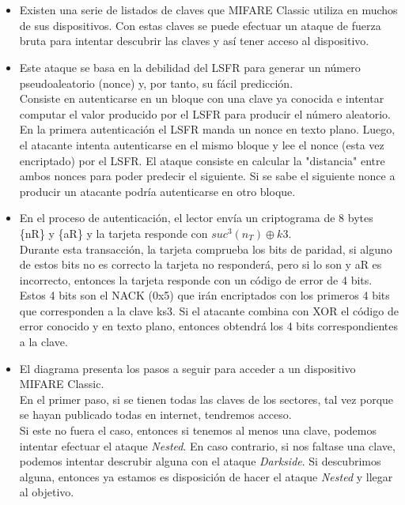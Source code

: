 \documentclass[10pt,a4paper]{article}
\begin{document}
\section{}
\begin{itemize}
\item Existen una serie de listados de claves que MIFARE Classic utiliza en muchos de sus dispositivos. Con estas claves se puede efectuar un ataque de fuerza bruta para intentar descubrir las claves y así tener acceso al dispositivo.

\item Este ataque se basa en la debilidad del LSFR para generar un número pseudoaleatorio (nonce) y, por tanto, su fácil predicción. \\
Consiste en autenticarse en un bloque con una clave ya conocida e intentar computar el valor producido por el LSFR para producir el número aleatorio. En la primera autenticación el LSFR manda un nonce en texto plano. Luego, el atacante intenta autenticarse en el mismo bloque y lee el nonce (esta vez encriptado) por el LSFR. El ataque consiste en calcular la "distancia" entre ambos nonces para poder predecir el siguiente. Si se sabe el siguiente nonce a producir un atacante podría autenticarse en otro bloque.

\item En el proceso de autenticación, el lector envía un criptograma de 8 bytes \{nR\} y \{aR\} y la tarjeta responde con $suc^{3}(n_{T}) \oplus k3$. \\
Durante esta transacción, la tarjeta comprueba los bits de paridad, si alguno de estos bits no es correcto la tarjeta no responderá, pero si lo son y {aR} es incorrecto, entonces la tarjeta responde con un código de error de 4 bits. Estos 4 bits son el NACK (0x5) que irán encriptados con los primeros 4 bits que corresponden a la clave ks3. Si el atacante combina con XOR el código de error conocido y en texto plano, entonces obtendrá los 4 bits correspondientes a la clave.

\item El diagrama presenta los pasos a seguir para acceder a un dispositivo MIFARE Classic.\\
En el primer paso, si se tienen todas las claves de los sectores, tal vez porque se hayan publicado todas en internet, tendremos acceso.\\
Si este no fuera el caso, entonces si tenemos al menos una clave, podemos intentar efectuar el ataque \textit{Nested}. En caso contrario, si nos faltase una clave, podemos intentar descrubir alguna con el ataque \textit{Darkside}. Si descubrimos alguna, entonces ya estamos es disposición de hacer el ataque \textit{Nested} y llegar al objetivo.
\end{itemize}
\end{document}
